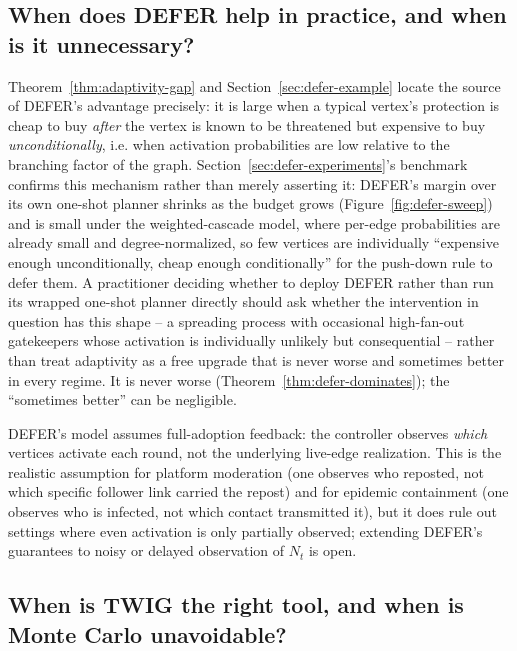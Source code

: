 \documentclass[ijoc,sglanonrev]{informs4}
\begin{document}
\subsection{When does DEFER help in practice, and when is it unnecessary?}

Theorem~\ref{thm:adaptivity-gap} and Section~\ref{sec:defer-example} locate
the source of DEFER's advantage precisely: it is large when a typical
vertex's protection is cheap to buy \emph{after} the vertex is known to be
threatened but expensive to buy \emph{unconditionally}, i.e. when
activation probabilities are low relative to the branching factor of the
graph. Section~\ref{sec:defer-experiments}'s benchmark confirms this
mechanism rather than merely asserting it: DEFER's margin over its own
one-shot planner shrinks as the budget grows (Figure~\ref{fig:defer-sweep})
and is small under the weighted-cascade model, where per-edge probabilities
are already small and degree-normalized, so few vertices are individually
``expensive enough unconditionally, cheap enough conditionally'' for the
push-down rule to defer them. A practitioner deciding whether to deploy
DEFER rather than run its wrapped one-shot planner directly should ask
whether the intervention in question has this shape -- a spreading
process with occasional high-fan-out gatekeepers whose activation is
individually unlikely but consequential -- rather than treat adaptivity as
a free upgrade that is never worse and sometimes better in every regime.
It is never worse (Theorem~\ref{thm:defer-dominates}); the ``sometimes
better'' can be negligible.

DEFER's model assumes full-adoption feedback: the controller observes
\emph{which} vertices activate each round, not the underlying live-edge
realization. This is the realistic assumption for platform moderation
(one observes who reposted, not which specific follower link carried the
repost) and for epidemic containment (one observes who is infected, not
which contact transmitted it), but it does rule out settings where even
activation is only partially observed; extending DEFER's guarantees to
noisy or delayed observation of $N_t$ is open.

\subsection{When is TWIG the right tool, and when is Monte Carlo unavoidable?}
\end{document}

